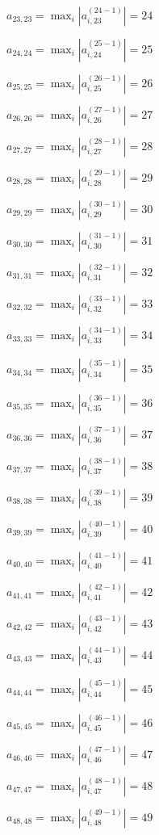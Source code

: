 \documentclass[a4paper,12pt]{article}
\begin{document}
$a _{ 23, 23 } =  \max _i |a _{ i, 23 } ^{ (24 - 1) } | = 24$

$a _{ 24, 24 } =  \max _i |a _{ i, 24 } ^{ (25 - 1) } | = 25$

$a _{ 25, 25 } =  \max _i |a _{ i, 25 } ^{ (26 - 1) } | = 26$

$a _{ 26, 26 } =  \max _i |a _{ i, 26 } ^{ (27 - 1) } | = 27$

$a _{ 27, 27 } =  \max _i |a _{ i, 27 } ^{ (28 - 1) } | = 28$

$a _{ 28, 28 } =  \max _i |a _{ i, 28 } ^{ (29 - 1) } | = 29$

$a _{ 29, 29 } =  \max _i |a _{ i, 29 } ^{ (30 - 1) } | = 30$

$a _{ 30, 30 } =  \max _i |a _{ i, 30 } ^{ (31 - 1) } | = 31$

$a _{ 31, 31 } =  \max _i |a _{ i, 31 } ^{ (32 - 1) } | = 32$

$a _{ 32, 32 } =  \max _i |a _{ i, 32 } ^{ (33 - 1) } | = 33$

$a _{ 33, 33 } =  \max _i |a _{ i, 33 } ^{ (34 - 1) } | = 34$

$a _{ 34, 34 } =  \max _i |a _{ i, 34 } ^{ (35 - 1) } | = 35$

$a _{ 35, 35 } =  \max _i |a _{ i, 35 } ^{ (36 - 1) } | = 36$

$a _{ 36, 36 } =  \max _i |a _{ i, 36 } ^{ (37 - 1) } | = 37$

$a _{ 37, 37 } =  \max _i |a _{ i, 37 } ^{ (38 - 1) } | = 38$

$a _{ 38, 38 } =  \max _i |a _{ i, 38 } ^{ (39 - 1) } | = 39$

$a _{ 39, 39 } =  \max _i |a _{ i, 39 } ^{ (40 - 1) } | = 40$

$a _{ 40, 40 } =  \max _i |a _{ i, 40 } ^{ (41 - 1) } | = 41$

$a _{ 41, 41 } =  \max _i |a _{ i, 41 } ^{ (42 - 1) } | = 42$

$a _{ 42, 42 } =  \max _i |a _{ i, 42 } ^{ (43 - 1) } | = 43$

$a _{ 43, 43 } =  \max _i |a _{ i, 43 } ^{ (44 - 1) } | = 44$

$a _{ 44, 44 } =  \max _i |a _{ i, 44 } ^{ (45 - 1) } | = 45$

$a _{ 45, 45 } =  \max _i |a _{ i, 45 } ^{ (46 - 1) } | = 46$

$a _{ 46, 46 } =  \max _i |a _{ i, 46 } ^{ (47 - 1) } | = 47$

$a _{ 47, 47 } =  \max _i |a _{ i, 47 } ^{ (48 - 1) } | = 48$

$a _{ 48, 48 } =  \max _i |a _{ i, 48 } ^{ (49 - 1) } | = 49$
\end{document}
